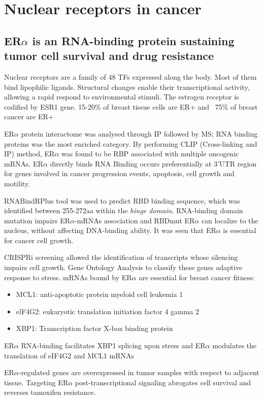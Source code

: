 \section{Nuclear receptors in cancer}
\subsection{ER$\alpha$ is an RNA-binding protein sustaining tumor cell survival and drug resistance}
Nuclear receptors are a family of 48 TFs expressed along the body. Most of them bind lipophilic ligands.
Structural changes enable their transcriptional activity, allowing a rapid respond to environmental stimuli.
The estrogen receptor is codified by ESR1 gene. 15-20\% of breast tissue cells are ER+ and  ~75\% of breast cancer are ER+ 

ER$\alpha$ protein interactome was analysed through IP followed by MS; RNA binding proteins was the most enriched category. By performing CLIP (Cross-linking and IP) method, ER$\alpha$ was found to be RBP associated with multiple oncogenic mRNAs.  ER$\alpha$ directly binds RNA
Binding occurs preferentially at 3’UTR region for genes involved in cancer progression events, apoptosis, cell growth and motility.

RNABindRPlus tool was used to predict RBD binding sequence, which was identified between 255-272aa within the \emph{hinge domain}. RNA-binding domain mutation impairs ER$\alpha$-mRNAs association and RBDmut ER$\alpha$ can localize to the nucleus, without affecting DNA-binding ability. It was seen that ER$\alpha$ is essential for cancer cell growth.

CRISPRi screening allowed the identification of transcripts whose silencing impairs cell growth. Gene Ontology Analysis to classify these genes  adaptive response to stress. 
mRNAs bound by  ER$\alpha$ are essential for breast cancer fitness:
\begin{itemize}
\item MCL1: anti-apoptotic protein myeloid cell leukemia 1
\item elF4G2: eukaryotic translation initiation factor 4 gamma 2
\item XBP1: Transcription factor X-box binding protein
\end{itemize}
ER$\alpha$ RNA-binding facilitates XBP1 splicing upon stress and ER$\alpha$  modulates the translation of eIF4G2 and MCL1 mRNAs


ER$\alpha$-regulated genes are overexpressed in tumor samples with respect to adjacent tissue.
Targeting ER$\alpha$ post-transcriptional signaling abrogates cell survival and reverses tamoxifen resistance.

